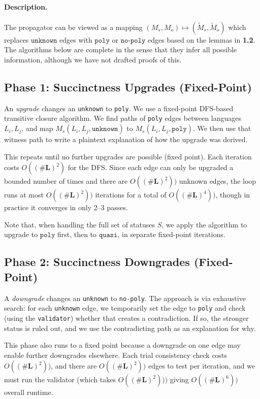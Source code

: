 \documentclass[10pt]{article}
\theoremstyle{plain}
\theoremstyle{definition}
\theoremstyle{remark}
\begin{document}
\paragraph{Description.} The propagator can be viewed as a mapping $(M_s, M_o) \mapsto (\widetilde M_s, \widetilde M_o)$ which replaces $\texttt{unknown}$ edges with $\texttt{poly}$ or $\texttt{no-poly}$ edges based on the lemmas in \textbf{1.2}. The algorithms below are complete in the sense that they infer all possible information, although we have not drafted proofs of this.

\subsection{Phase 1: Succinctness Upgrades (Fixed-Point)}

An \emph{upgrade} changes an \texttt{unknown} to \texttt{poly}. We use a fixed-point DFS-based transitive closure algorithm. We find paths of \texttt{poly} edges between languages $L_i, L_j$, and map $M_s(L_i, L_j, \texttt{unknown})$ to $M_s(L_i, L_j, \texttt{poly})$. We then use that witness path to write a plaintext explanation of how the upgrade was derived.

This repeats until no further upgrades are possible (fixed point). Each iteration costs $O((\#\textbf{L})^2)$ for the DFS. Since each edge can only be upgraded a bounded number of times and there are $O((\#\textbf{L})^2))$ unknown edges, the loop runs at most $O((\#\textbf{L})^2))$ iterations for a total of $O((\#\textbf{L})^4))$, though in practice it converges in only 2--3 passes.

Note that, when handling the full set of statuses $S$, we apply the algorithm to upgrade to $\texttt{poly}$ first, then to $\texttt{quasi}$, in separate fixed-point iterations.

\subsection{Phase 2: Succinctness Downgrades (Fixed-Point)}

A \emph{downgrade} changes an \texttt{unknown} to \texttt{no-poly}. The approach is via exhaustive search: for each \texttt{unknown} edge, we temporarily set the edge to \texttt{poly} and check (using the \texttt{validator}) whether that creates a contradiction. If so, the stronger status is ruled out, and we use the contradicting path as an explanation for why.

This phase also runs to a fixed point because a downgrade on one edge may enable further downgrades elsewhere. Each trial consistency check costs $O((\#\textbf{L})^2))$, and there are $O((\#\textbf{L})^2))$ edges to test per iteration, and we must run the validator (which takes $O((\#\textbf{L})^2)))$ giving $O((\#\textbf{L})^6))$ overall runtime.
\end{document}
